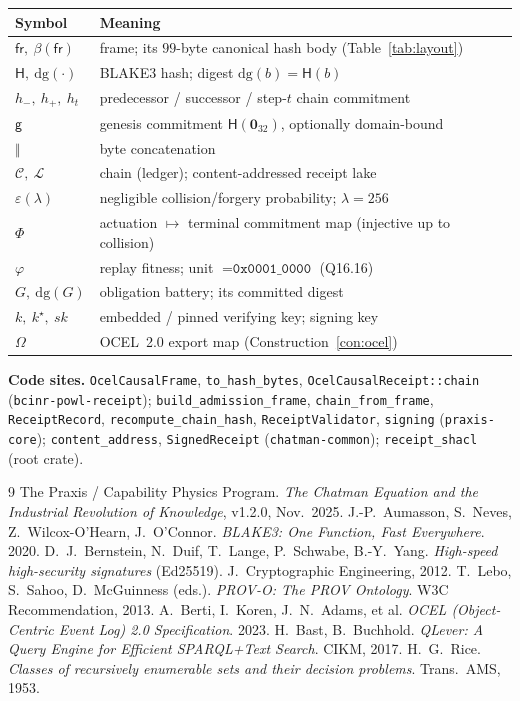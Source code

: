\documentclass[11pt,oneside]{book}
\theoremstyle{definition}
\theoremstyle{plain}
\theoremstyle{remark}
\newcommand{\chainH}{\mathsf{H}}               %
\newcommand{\Fitness}{\varphi}
\newcommand{\dg}{\mathrm{dg}}                   %
\newcommand{\fr}{\mathsf{fr}}                   %
\newcommand{\body}{\beta}                       %
\newcommand{\code}[1]{\texttt{#1}}
\newcommand{\concat}{\mathbin{\Vert}}           %
\newcommand{\Genesis}{\mathsf{g}}               %
\newcommand{\Lake}{\mathcal{L}}                 %
\newcommand{\Ledger}{\mathcal{C}}               %
\begin{document}
\begin{tabular}{ll}
\toprule
Symbol & Meaning\\
\midrule
$\fr,\ \body(\fr)$ & frame; its $99$-byte canonical hash body (Table~\ref{tab:layout})\\
$\chainH,\ \dg(\cdot)$ & BLAKE3 hash; digest $\dg(b)=\chainH(b)$\\
$h_{-},\ h_{+},\ h_t$ & predecessor / successor / step-$t$ chain commitment\\
$\Genesis$ & genesis commitment $\chainH(\bm 0_{32})$, optionally domain-bound\\
$\concat$ & byte concatenation\\
$\Ledger,\ \Lake$ & chain (ledger); content-addressed receipt lake\\
$\varepsilon(\lambda)$ & negligible collision/forgery probability; $\lambda=256$\\
$\Phi$ & actuation $\mapsto$ terminal commitment map (injective up to collision)\\
$\Fitness$ & replay fitness; unit $=\code{0x0001\_0000}$ (Q16.16)\\
$G,\ \dg(G)$ & obligation battery; its committed digest\\
$k,\ k^{\star},\ sk$ & embedded / pinned verifying key; signing key\\
$\Omega$ & OCEL~2.0 export map (Construction~\ref{con:ocel})\\
\bottomrule
\end{tabular}

\vspace{1em}
\noindent\textbf{Code sites.} \code{OcelCausalFrame}, \code{to\_hash\_bytes},
\code{OcelCausalReceipt::chain} (\code{bcinr-powl-receipt});
\code{build\_admission\_frame}, \code{chain\_from\_frame}, \code{ReceiptRecord},
\code{recompute\_chain\_hash}, \code{ReceiptValidator}, \code{signing} (\code{praxis-core});
\code{content\_address}, \code{SignedReceipt} (\code{chatman-common}); \code{receipt\_shacl}
(root crate).

\begin{thebibliography}{9}
 The Praxis / Capability Physics Program.
\emph{The Chatman Equation and the Industrial Revolution of Knowledge}, v1.2.0, Nov.\ 2025.
 J.-P.\ Aumasson, S.\ Neves, Z.\ Wilcox-O'Hearn, J.\ O'Connor.
\emph{BLAKE3: One Function, Fast Everywhere}. 2020.
 D.\ J.\ Bernstein, N.\ Duif, T.\ Lange, P.\ Schwabe, B.-Y.\ Yang.
\emph{High-speed high-security signatures} (Ed25519). J.\ Cryptographic Engineering, 2012.
 T.\ Lebo, S.\ Sahoo, D.\ McGuinness (eds.).
\emph{PROV-O: The PROV Ontology}. W3C Recommendation, 2013.
 A.\ Berti, I.\ Koren, J.\ N.\ Adams, et al.
\emph{OCEL (Object-Centric Event Log) 2.0 Specification}. 2023.
 H.\ Bast, B.\ Buchhold.
\emph{QLever: A Query Engine for Efficient SPARQL+Text Search}. CIKM, 2017.
 H.\ G.\ Rice.
\emph{Classes of recursively enumerable sets and their decision problems}.
Trans.\ AMS, 1953.
\end{thebibliography}
\end{document}
